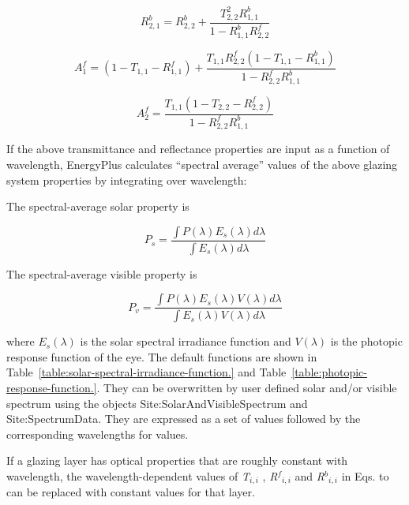 \begin{equation}
R_{2,1}^b = R_{2,2}^b + \frac{{T_{2,2}^2R_{1,1}^b}}{{1 - R_{1,1}^bR_{2,2}^f}}
\end{equation}

\begin{equation}
A_1^f = (1 - {T_{1,1}} - R_{1,1}^f) + \frac{{{T_{1,1}}R_{2,2}^f(1 - {T_{1,1}} - R_{1,1}^b)}}{{1 - R_{2,2}^fR_{1,1}^b}}
\end{equation}

\begin{equation}
A_2^f = \frac{{{T_{1,1}}(1 - {T_{2,2}} - R_{2,2}^f)}}{{1 - R_{2,2}^fR_{1,1}^b}}
\end{equation}

If the above transmittance and reflectance properties are input as a function of wavelength, EnergyPlus calculates ``spectral average'' values of the above glazing system properties by integrating over wavelength:

The spectral-average solar property is

\begin{equation}
{P_s} = \frac{{\int {P(\lambda ){E_s}(\lambda )d\lambda } }}{{\int {{E_s}(\lambda )d\lambda } }}
\end{equation}

The spectral-average visible property is

\begin{equation}
{P_v} = \frac{{\int {P(\lambda ){E_s}(\lambda )V(\lambda )d\lambda } }}{{\int {{E_s}(\lambda )V(\lambda )d\lambda } }}
\end{equation}

where \({E_s}(\lambda )\) is the solar spectral irradiance function and \(V(\lambda )\) is the photopic response function of the eye. The default functions are shown in Table~\ref{table:solar-spectral-irradiance-function.} and Table~\ref{table:photopic-response-function.}. They can be overwritten by user defined solar and/or visible spectrum using the objects Site:SolarAndVisibleSpectrum and Site:SpectrumData. They are expressed as a set of values followed by the corresponding wavelengths for values.

If a glazing layer has optical properties that are roughly constant with wavelength, the wavelength-dependent values of \emph{T\(_{i,i}\)} , \emph{R\(^{f}\)\(_{i,i}\)} and \emph{R\(^{b}\)\(_{i,i}\)} in Eqs. to can be replaced with constant values for that layer.


